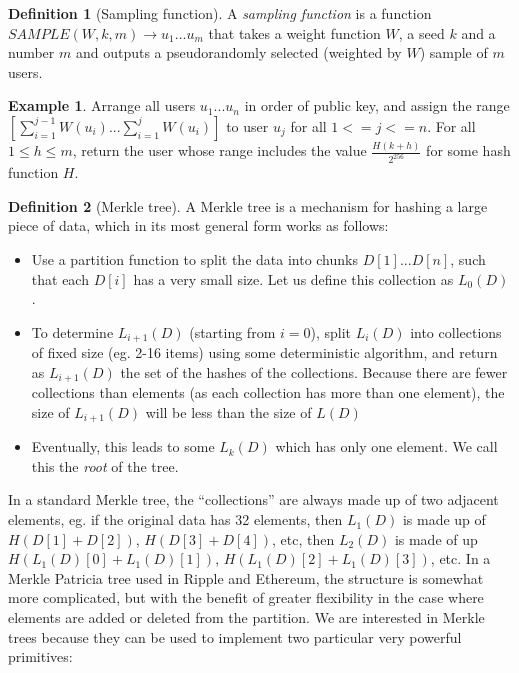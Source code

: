 \documentclass[11pt,a4paper]{article}
\theoremstyle{plain}
\theoremstyle{definition}
\newtheorem{defn}{Definition}[section]
\newtheorem{exmp}{Example}[section]
\theoremstyle{remark}
\begin{document}
\begin{defn}[Sampling function]
A \emph{sampling function} is a function $SAMPLE(W, k, m) \rightarrow {u_1 ... u_m}$ that takes a weight function $W$, a seed $k$ and a number $m$ and outputs a pseudorandomly selected (weighted by $W$) sample of $m$ users.
\end{defn}

\begin{exmp}
Arrange all users $u_1 ... u_n$ in order of public key, and assign the range $[\sum_{i=1}^{j-1} W(u_i)...\sum_{i=1}^j W(u_i)]$ to user $u_j$ for all $1 <= j <= n$. For all $1 \le h \le m$, return the user whose range includes the value $\frac{H(k + h)}{2^{256}}$ for some hash function $H$.
\end{exmp}

\begin{defn}[Merkle tree]
A Merkle tree\cite{merkle} is a mechanism for hashing a large piece of data, which in its most general form works as follows:
\begin{itemize}
\item
Use a partition function to split the data into chunks $D[1] ... D[n]$, such that each $D[i]$ has a very small size. Let us define this collection as $L_0(D)$.
\item
To determine $L_{i+1}(D)$ (starting from $i = 0$), split $L_i(D)$ into collections of fixed size (eg. 2-16 items) using some deterministic algorithm, and return as $L_{i+1}(D)$ the set of the hashes of the collections. Because there are fewer collections than elements (as each collection has more than one element), the size of $L_{i+1}(D)$ will be less than the size of $L(D)$
\item
Eventually, this leads to some $L_k(D)$ which has only one element. We call this the \emph{root} of the tree.
\end{itemize}
\end{defn}

In a standard Merkle tree, the ``collections'' are always made up of two adjacent elements, eg. if the original data has 32 elements, then $L_1(D)$ is made up of $H(D[1] + D[2])$, $H(D[3] + D[4])$, etc, then $L_2(D)$ is made of up $H(L_1(D)[0] + L_1(D)[1])$, $H(L_1(D)[2] + L_1(D)[3])$, etc. In a Merkle Patricia tree\cite{mpt} used in Ripple and Ethereum, the structure is somewhat more complicated, but with the benefit of greater flexibility in the case where elements are added or deleted from the partition. We are interested in Merkle trees because they can be used to implement two particular very powerful primitives:
\end{document}
